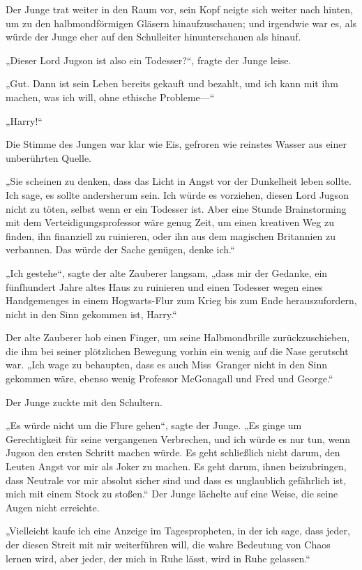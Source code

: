 {Der Junge trat weiter in den Raum vor, sein Kopf neigte sich weiter nach hinten, um zu den halbmondförmigen Gläsern hinaufzuschauen; und irgendwie war es, als würde der Junge eher auf den Schulleiter hinunterschauen als hinauf.

„Dieser Lord Jugson ist also ein Todesser?“, fragte der Junge leise.

„Gut. Dann ist sein Leben bereits gekauft und bezahlt, und ich kann mit ihm machen, was ich will, ohne ethische Probleme—“

„Harry!“

Die Stimme des Jungen war klar wie Eis, gefroren wie reinstes Wasser aus einer unberührten Quelle.

„Sie scheinen zu denken, dass das Licht in Angst vor der Dunkelheit leben sollte. Ich sage, es sollte andersherum sein. Ich würde es vorziehen, diesen Lord Jugson nicht zu töten, selbst wenn er ein Todesser ist. Aber eine Stunde Brainstorming mit dem Verteidigungsprofessor wäre genug Zeit, um einen kreativen Weg zu finden, ihn finanziell zu ruinieren, oder ihn aus dem magischen Britannien zu verbannen. Das würde der Sache genügen, denke ich.“

„Ich gestehe“, sagte der alte Zauberer langsam, „dass mir der Gedanke, ein fünfhundert Jahre altes Haus zu ruinieren und einen Todesser wegen eines Handgemenges in einem Hogwarts-Flur zum Krieg bis zum Ende herauszufordern, nicht in den Sinn gekommen ist, Harry.“

Der alte Zauberer hob einen Finger, um seine Halbmondbrille zurückzuschieben, die ihm bei seiner plötzlichen Bewegung vorhin ein wenig auf die Nase gerutscht war. „Ich wage zu behaupten, dass es auch Miss~Granger nicht in den Sinn gekommen wäre, ebenso wenig Professor McGonagall und Fred und George.“

Der Junge zuckte mit den Schultern.

„Es würde nicht um die Flure gehen“, sagte der Junge. „Es ginge um Gerechtigkeit für seine vergangenen Verbrechen, und ich würde es nur tun, wenn Jugson den ersten Schritt machen würde. Es geht schließlich nicht darum, den Leuten Angst vor mir als Joker zu machen. Es geht darum, ihnen beizubringen, dass Neutrale vor mir absolut sicher sind und dass es unglaublich gefährlich ist, mich mit einem Stock zu stoßen.“ Der Junge lächelte auf eine Weise, die seine Augen nicht erreichte.

„Vielleicht kaufe ich eine Anzeige im Tagespropheten, in der ich sage, dass jeder, der diesen Streit mit mir weiterführen will, die wahre Bedeutung von Chaos lernen wird, aber jeder, der mich in Ruhe lässt, wird in Ruhe gelassen.“

}
